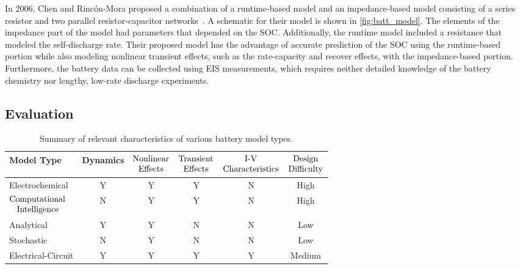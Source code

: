 \documentclass[../zhang_thesis.tex]{subfiles}
\begin{document}
In 2006, Chen and Rinc\'on-Mora proposed a combination of a runtime-based model and an impedance-based model consisting of a series resistor and two parallel resistor-capacitor networks~\cite{chen06}. A schematic for their model is shown in \cref{fig:batt_model}. The elements of the impedance part of the model had parameters that depended on the SOC. Additionally, the runtime model included a resistance that modeled the self-discharge rate. Their proposed model has the advantage of
accurate prediction of the SOC using the runtime-based portion while also modeling nonlinear transient effects, such as the rate-capacity and recover effects, with the impedance-based portion. Furthermore, the battery data can be collected using EIS measurements, which requires neither detailed knowledge of the battery chemistry nor lengthy, low-rate discharge experiments.

\subsection{Evaluation}

\begin{table}[b]
\centering
\caption{Summary of relevant characteristics of various battery model types.}
\begin{tabular}{lccccc}
    \toprule
    Model Type & Dynamics & $\vcenter{\setbox0\hbox{\strut Nonlinear}\copy0\hbox to\wd0{\hss\strut Effects\hss}}$ & $\vcenter{\setbox0\hbox{\strut Transient}\copy0\hbox to\wd0{\hss\strut Effects\hss}}$ & $\vcenter{\setbox0\hbox{\strut Characteristics}\hbox to\wd0{\hss\strut I-V\hss}\copy0}$ & $\vcenter{\setbox0\hbox{\strut Difficulty}\hbox to\wd0{\hss\strut Design\hss}\copy0}$ \\
    \midrule
	Electrochemical & Y & Y & Y & N & High \\
    $\vcenter{\setbox0\hbox{\strut Computational\strut}\copy0\hbox to\wd0{\hspace{2ex}\strut Intelligence\hss}}$ & N & Y & Y & N & High \\
    Analytical & Y & Y & N & N & Low \\
    Stochastic & N & Y & N & N & Low \\
    Electrical-Circuit & Y & Y & Y & Y & Medium \\
    \bottomrule
\end{tabular}
\label{tab:model_charac}
\end{table}
\end{document}
